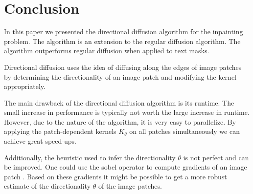 \section{Conclusion}
\label{sec:conclusion}

In this paper we presented the directional diffusion algorithm for the inpainting problem. The algorithm is an extension to the regular diffusion algorithm. The algorithm outperforms regular diffusion when applied to text masks.

Directional diffusion uses the idea of diffusing along the edges of image patches by determining the directionality of an image patch and modifying the kernel appropriately.

The main drawback of the directional diffusion algorithm is its runtime. The small increase in performance is typically not worth the large increase in runtime. However, due to the nature of the algorithm, it is very easy to parallelize. By applying the patch-dependent kernels $K_\theta$ on all patches simultaneously we can achieve great speed-ups.

Additionally, the heuristic used to infer the directionality $\theta$ is not perfect and can be improved. One could use the sobel operator to compute gradients of an image patch \cite{sobel2014history}. Based on these gradients it might be possible to get a more robust estimate of the directionality $\theta$ of the image patches. 

